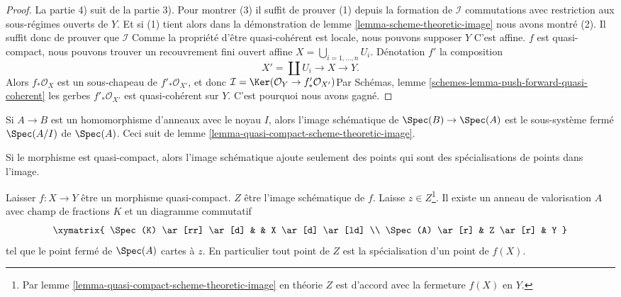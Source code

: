 \begin{proof}

La partie 4) suit de la partie 3). Pour montrer (3) il suffit de prouver (1) depuis la formation de $\mathcal{I}$ commutations avec restriction aux sous-régimes ouverts de $Y$. Et si (1) tient alors dans la démonstration de lemme \ref{lemma-scheme-theoretic-image}
nous avons montré (2). Il suffit donc de prouver que $\mathcal{I}$ Comme la propriété d'être quasi-cohérent est locale, nous pouvons supposer $Y$ C'est affine. $f$ est quasi-compact, nous pouvons trouver un recouvrement fini ouvert affine
$X = \bigcup_{i = 1, \ldots, n} U_i$. Dénotation $f'$ la composition
$$
X' = \coprod U_i \longrightarrow X \longrightarrow Y.
$$
Alors $f_*\mathcal{O}_X$ est un sous-chapeau de $f'_*\mathcal{O}_{X'}$, et donc $\mathcal{I} = \Ker(\mathcal{O}_Y \to f'_*\mathcal{O}_{X'})$Par Schémas, lemme \ref{schemes-lemma-push-forward-quasi-coherent}
les gerbes $f'_*\mathcal{O}_{X'}$ est quasi-cohérent sur $Y$. C'est pourquoi nous avons gagné.

\end{proof}

\begin{example}

\label{example-scheme-theoretic-image}
Si $A \to B$ est un homomorphisme d'anneaux avec le noyau $I$, alors l'image schématique de $\Spec(B) \to \Spec(A)$ est le sous-système fermé $\Spec(A/I)$ de $\Spec(A)$. Ceci suit de lemme \ref{lemma-quasi-compact-scheme-theoretic-image}.
\end{example}

\noindent
Si le morphisme est quasi-compact, alors l'image schématique ajoute seulement des points qui sont des spécialisations de points dans l'image.

\begin{lemma}

\label{lemma-reach-points-scheme-theoretic-image}

Laisser $f : X \to Y$ être un morphisme quasi-compact. $Z$ être l'image schématique de $f$. Laisse $z \in Z$\footnote{Par lemme \ref{lemma-quasi-compact-scheme-theoretic-image} en théorie
$Z$ est d'accord avec la fermeture $f(X)$ en $Y$.}. Il existe un anneau de valorisation $A$ avec champ de fractions $K$ et un diagramme commutatif
$$
\xymatrix{
\Spec(K) \ar[rr] \ar[d] & & X \ar[d] \ar[ld] \\
\Spec(A) \ar[r] & Z \ar[r] & Y
}
$$
tel que le point fermé de $\Spec(A)$ cartes à $z$. En particulier tout point de $Z$ est la spécialisation d'un point de $f(X)$.

\end{lemma}

